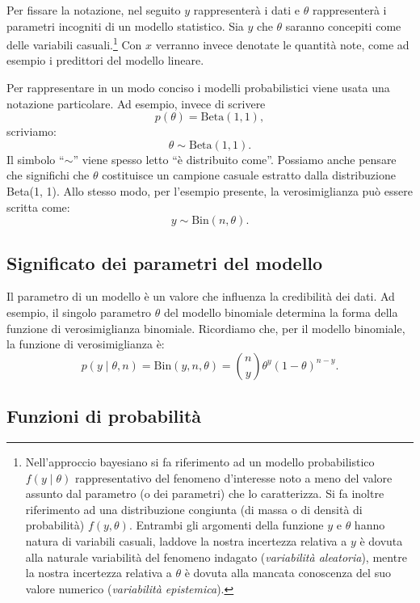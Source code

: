 \documentclass[
  10pt,
  italian,
  a4paper,
  extrafontsizes,onecolumn,openright
  ]{memoir}
\begin{document}
Per fissare la notazione, nel seguito \(y\) rappresenterà i dati e \(\theta\) rappresenterà i parametri incogniti di un modello statistico. Sia \(y\) che \(\theta\) saranno concepiti come delle variabili casuali.\footnote{Nell'approccio bayesiano si fa riferimento ad un modello probabilistico \(f(y \mid \theta)\) rappresentativo del fenomeno d'interesse noto a meno del valore assunto dal parametro (o dei parametri) che lo caratterizza. Si fa inoltre riferimento ad una distribuzione congiunta (di massa o di densità di probabilità) \(f(y, \theta)\). Entrambi gli argomenti della funzione \(y\) e \(\theta\) hanno natura di variabili casuali, laddove la nostra incertezza relativa a \(y\) è dovuta alla naturale variabilità del fenomeno indagato (\emph{variabilità aleatoria}), mentre la nostra incertezza relativa a \(\theta\) è dovuta alla mancata conoscenza del suo valore numerico (\emph{variabilità epistemica}).} Con \(x\) verranno invece denotate le quantità note, come ad esempio i predittori del modello lineare.

Per rappresentare in un modo conciso i modelli probabilistici viene usata una notazione particolare. Ad esempio, invece di scrivere
\[
p(\theta) = \text{Beta}(1, 1),
\]
scriviamo:
\[
\theta \sim \text{Beta}(1, 1).
\]
Il simbolo ``\(\sim\)'' viene spesso letto ``è distribuito come''. Possiamo anche pensare che significhi che \(\theta\) costituisce un campione casuale estratto dalla distribuzione Beta(1, 1). Allo stesso modo, per l'esempio presente, la verosimiglianza può essere scritta come:
\[
y \sim \text{Bin}(n, \theta).
\]

\hypertarget{significato-dei-parametri-del-modello}{%
\subsection{Significato dei parametri del modello}\label{significato-dei-parametri-del-modello}}

Il parametro di un modello è un valore che influenza la credibilità dei dati. Ad esempio, il singolo parametro \(\theta\) del modello binomiale determina la forma della funzione di verosimiglianza binomiale. Ricordiamo che, per il modello binomiale, la funzione di verosimiglianza è:
\[
p(y \mid \theta, n) = \text{Bin}(y, n, \theta) = \binom{n}{y}\theta^y(1-\theta)^{n-y}.
\]

\hypertarget{funzioni-di-probabilituxe0}{%
\subsection{Funzioni di probabilità}\label{funzioni-di-probabilituxe0}}
\end{document}
